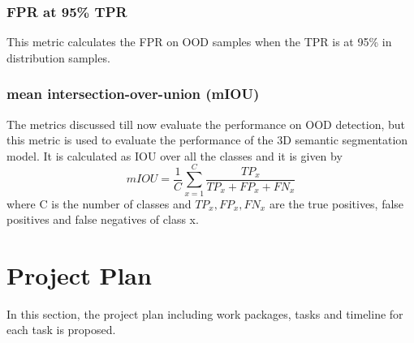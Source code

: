 \documentclass[thesis]{mas_proposal}
\begin{document}
\subsubsection{FPR at 95\% TPR}
This metric calculates the FPR on OOD samples when the TPR is at 95\% in distribution samples.
\subsubsection{mean intersection-over-union (mIOU)}
The metrics discussed till now evaluate the performance on OOD detection, but this metric is used to evaluate the performance of the 3D semantic segmentation model.
It is calculated as IOU over all the classes and it is given by
$$
    mIOU=\frac{1}{C} \sum_{x=1}^C \frac{TP_x}{TP_x + FP_x + FN_x}
$$
where C is the number of classes and $TP_x, FP_x, FN_x$ are the true positives, false positives and false negatives of class x.

\section{Project Plan}
In this section, the project plan including work packages, tasks and timeline for each task is proposed.
\end{document}
